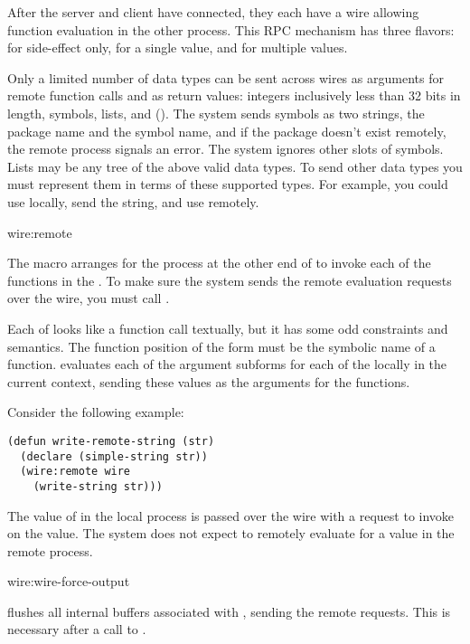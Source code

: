 After the server and client have connected, they each have a wire
allowing function evaluation in the other process.  This RPC mechanism
has three flavors: for side-effect only, for a single value, and for
multiple values.

Only a limited number of data types can be sent across wires as
arguments for remote function calls and as return values: integers
inclusively less than 32 bits in length, symbols, lists, and
 ().  The system sends symbols
as two strings, the package name and the symbol name, and if the
package doesn't exist remotely, the remote process signals an error.
The system ignores other slots of symbols.  Lists may be any tree of
the above valid data types.  To send other data types you must
represent them in terms of these supported types.  For example, you
could use  locally, send the string, and use
 remotely.

\begin{defmac}{wire:}{remote}{%
    }
  
  The  macro arranges for the process at the other end of
   to invoke each of the functions in the .
  To make sure the system sends the remote evaluation requests over
  the wire, you must call .
  
  Each of  looks like a function call textually, but
  it has some odd constraints and semantics.  The function position of
  the form must be the symbolic name of a function.  
  evaluates each of the argument subforms for each of the
   locally in the current context, sending these
  values as the arguments for the functions.
  
  Consider the following example:

\begin{verbatim}
(defun write-remote-string (str)
  (declare (simple-string str))
  (wire:remote wire
    (write-string str)))
\end{verbatim}

  The value of  in the local process is passed over the wire
  with a request to invoke  on the value.  The
  system does not expect to remotely evaluate  for a value
  in the remote process.
\end{defmac}

\begin{defun}{wire:}{wire-force-output}{}
  
   flushes all internal buffers associated
  with , sending the remote requests.  This is necessary
  after a call to .
\end{defun}

